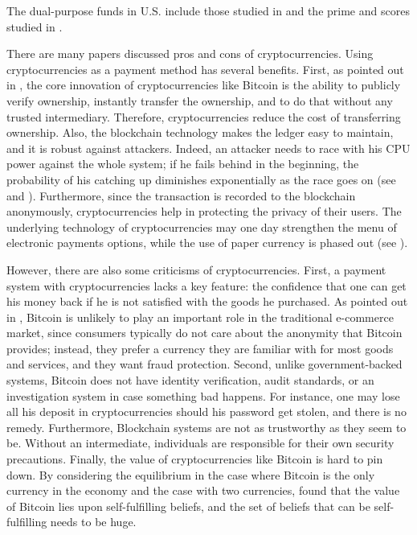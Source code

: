 \documentclass[draft, noinfoline]{ectaart}
\numberwithin{equation}{section}
\theoremstyle{plain}
\begin{document}
\begin{table}[!htb]
\begin{tabularx}{1\linewidth}{@{}c c c@{}}
	\bottomrule
	\end{tabularx}
	\vspace{0.5em}
	\par\flushleft\scriptsize The dual-purpose funds in U.S. include those studied in \cite{ingersoll_theoretical_1976} and the prime and scores studied in \cite{jarrow_primes_1989}.
\end{table}




There are many papers discussed pros and cons of cryptocurrencies.
Using cryptocurrencies as a payment method has several benefits. First, as pointed out in \cite{harvey_cryptofinance_2016}, the core innovation of cryptocurrencies like Bitcoin is the ability to publicly verify ownership, instantly transfer the ownership, and to do that without any trusted intermediary. Therefore, cryptocurrencies reduce the cost of transferring ownership. Also, the blockchain technology makes the ledger easy to maintain, and it is robust against attackers. Indeed, an attacker needs to race with his CPU power against the whole system; if he fails behind in the beginning, the probability of his catching up diminishes exponentially as the race goes on (see \cite{nakamoto_bitcoin:_2008} and  \cite{Grunspan_2018}). Furthermore, since the transaction is recorded to the blockchain anonymously, cryptocurrencies help in protecting the privacy of their users. The underlying technology of cryptocurrencies may one day strengthen the menu of electronic payments options, while the use of paper currency is phased out (see \cite{rogoff_costs_2015}).

However, there are also some criticisms of cryptocurrencies. First, a payment system with cryptocurrencies lacks a key feature: the confidence that one can get his money back if he is not satisfied with the goods he purchased. As pointed out in \cite{grinberg_bitcoin:_2011}, Bitcoin is unlikely to play an important role in the traditional e-commerce market, since consumers typically do not care about the anonymity that Bitcoin provides; instead, they prefer a currency they are familiar with for most goods and services, and they want fraud protection.  Second, unlike government-backed systems, Bitcoin does not have identity verification, audit standards, or an investigation system in case something bad happens. For instance, one may lose all his deposit in cryptocurrencies should his password get stolen, and there is no remedy. Furthermore, Blockchain systems are not as trustworthy as they seem to be. Without an intermediate, individuals are responsible for their own security precautions. Finally, the value of cryptocurrencies like Bitcoin is hard to pin down. By considering the equilibrium in the case where Bitcoin is the only currency in the economy and the case with two currencies, \cite{garratt_bitcoin_2018} found that the value of Bitcoin lies upon self-fulfilling beliefs, and the set of beliefs that can be self-fulfilling needs to be huge.
\end{document}
